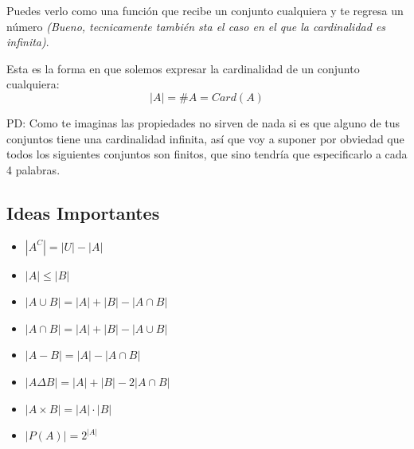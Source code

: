 \documentclass[12pt, fleqn]{report}                             %
\theoremstyle{break}                                            %
\begin{document}
            Puedes verlo como una función que recibe un conjunto cualquiera y te regresa
            un número \emph{(Bueno, tecnicamente también sta el caso en el que la cardinalidad es infinita)}.

            Esta es la forma en que solemos expresar la cardinalidad de un conjunto cualquiera:
            \begin{equation}   
                |A| = \#A = Card(A)
            \end{equation}

            PD: Como te imaginas las propiedades no sirven de nada si es que alguno de tus conjuntos
            tiene una cardinalidad infinita, así que voy a suponer por obviedad que todos los siguientes
            conjuntos son finitos, que sino tendría que especificarlo a cada 4 palabras.



            \clearpage
            \subsection{Ideas Importantes}

                \begin{itemize}
                    \item $|A^C| = |U| - |A|$
                    \item $|A| \leq |B|$
                    \item $|A \cup B| = |A| + |B| - |A \cap B|$
                    \item $|A \cap B| = |A| + |B| - |A \cup B|$
                    \item $|A - B| = |A| - |A \cap B|$
                    \item $|A \Delta B| = |A| + |B| - 2|A \cap B|$
                    \item $|A \times B| = |A| \cdot |B|$
                    \item $|P(A)| = 2^{|A|}$
                \end{itemize}








\end{document}
